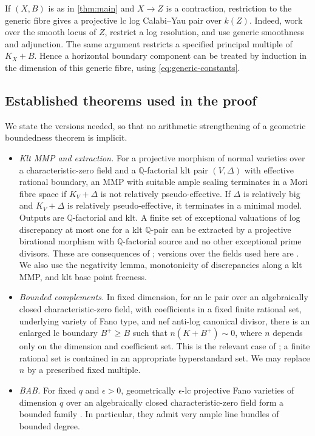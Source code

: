 \documentclass[11pt]{article}
\numberwithin{equation}{section}
\theoremstyle{definition}
\newcommand{\Q}{\mathbb Q}
\begin{document}
If $(X,B)$ is as in \cref{thm:main} and $X\to Z$ is a contraction,
restriction to the generic fibre gives a projective lc log Calabi--Yau
pair over $k(Z)$. Indeed, work over the smooth locus of $Z$, restrict a
log resolution, and use generic smoothness and adjunction. The same
argument restricts a specified principal multiple of $K_X+B$. Hence a
horizontal boundary component can be treated by induction in the
dimension of this generic fibre, using \eqref{eq:generic-constants}.

\subsection{Established theorems used in the proof}

We state the versions needed, so that no arithmetic strengthening of a
geometric boundedness theorem is implicit.

\begin{itemize}
\item \emph{Klt MMP and extraction.} For a projective morphism of normal
varieties over a characteristic-zero field and a $\Q$-factorial klt pair
$(V,\Delta)$ with effective rational boundary, an MMP with suitable ample
scaling terminates in a Mori fibre space if $K_V+\Delta$ is not relatively
pseudo-effective. If $\Delta$ is relatively big and $K_V+\Delta$ is
relatively pseudo-effective, it terminates in a minimal model. Outputs
are $\Q$-factorial and klt. A finite set of exceptional valuations of
log discrepancy at most one for a klt $\Q$-pair can be extracted by a
projective birational morphism with $\Q$-factorial source and no other
exceptional prime divisors. These are consequences of
\cite{BCHM2010}; versions over the fields used here are
\cite[Theorem~21.7, Corollaries~21.9--21.10, Theorem~22.1]{LyuMurayama}.
We also use the negativity lemma, monotonicity of discrepancies along
a klt MMP, and klt base point freeness.

\item \emph{Bounded complements.} In fixed dimension, for an lc pair over
an algebraically closed characteristic-zero field, with coefficients in
a fixed finite rational set, underlying variety of Fano type, and nef
anti-log canonical divisor, there is an enlarged lc boundary $B^+\geq B$
such that $n(K+B^+)\sim0$, where $n$ depends only on the dimension and
coefficient set. This is the relevant case of
\cite[Theorem~1.7]{Birkar2019}; a finite rational set is contained in an
appropriate hyperstandard set. We may replace $n$ by a prescribed fixed
multiple.

\item \emph{BAB.} For fixed $q$ and $\epsilon>0$, geometrically
$\epsilon$-lc projective Fano varieties of dimension $q$ over an
algebraically closed characteristic-zero field form a bounded family
\cite[Theorem~1.1]{Birkar2021}. In particular, they admit very ample
line bundles of bounded degree.
\end{itemize}
\end{document}
